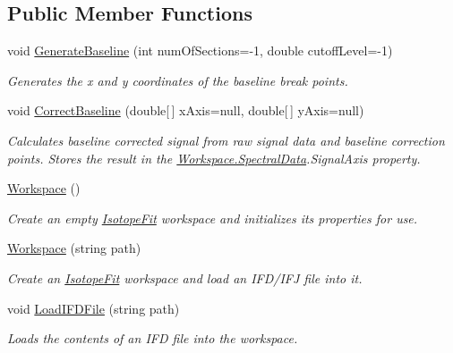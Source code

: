 \subsection*{Public Member Functions}
\begin{DoxyCompactItemize}
\item 
void \mbox{\hyperlink{class_isotope_fit_1_1_workspace_a80f09325539d16dd9eee6b470316db8b}{Generate\+Baseline}} (int num\+Of\+Sections=-\/1, double cutoff\+Level=-\/1)
\begin{DoxyCompactList}\small\item\em Generates the x and y coordinates of the baseline break points. \end{DoxyCompactList}\item 
void \mbox{\hyperlink{class_isotope_fit_1_1_workspace_aa0b81213937d49ae3a6183563cfe0f60}{Correct\+Baseline}} (double\mbox{[}$\,$\mbox{]} x\+Axis=null, double\mbox{[}$\,$\mbox{]} y\+Axis=null)
\begin{DoxyCompactList}\small\item\em Calculates baseline corrected signal from raw signal data and baseline correction points. Stores the result in the \mbox{\hyperlink{class_isotope_fit_1_1_workspace_a1d6cc2dd07cbfe920da9f1bffc9b32c2}{Workspace.\+Spectral\+Data}}.Signal\+Axis property. \end{DoxyCompactList}\item 
\mbox{\hyperlink{class_isotope_fit_1_1_workspace_affa8b6ac937cee367c225c606782da17}{Workspace}} ()
\begin{DoxyCompactList}\small\item\em Create an empty \mbox{\hyperlink{namespace_isotope_fit}{Isotope\+Fit}} workspace and initializes its properties for use. \end{DoxyCompactList}\item 
\mbox{\hyperlink{class_isotope_fit_1_1_workspace_a5aa1f6546513d331f262d383fe6b0358}{Workspace}} (string path)
\begin{DoxyCompactList}\small\item\em Create an \mbox{\hyperlink{namespace_isotope_fit}{Isotope\+Fit}} workspace and load an I\+F\+D/\+I\+FJ file into it. \end{DoxyCompactList}\item 
void \mbox{\hyperlink{class_isotope_fit_1_1_workspace_a55061c1f05d3e02d2d591fe6211d2f1f}{Load\+I\+F\+D\+File}} (string path)
\begin{DoxyCompactList}\small\item\em Loads the contents of an I\+FD file into the workspace. \end{DoxyCompactList}\item 

\end{DoxyCompactItemize}
